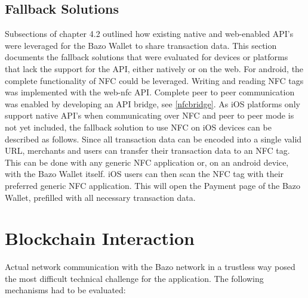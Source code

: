 \subsection{Fallback Solutions}
Subsections of chapter 4.2 outlined how existing native and web-enabled API's were leveraged for the Bazo Wallet to share transaction data. This section documents the fallback solutions that were evaluated for devices or platforms that lack the support for the API, either natively or on the web.
For android, the complete functionality of NFC could be leveraged. Writing and reading NFC tags was implemented with the web-nfc API. Complete peer to peer communication was enabled by developing an API bridge, see \ref{nfcbridge}.
As iOS platforms only support native API's when communicating over NFC and peer to peer mode is not yet included, the fallback solution to use NFC on iOS devices can be described as follows. Since all transaction data can be encoded into a single valid URL, merchants and users can transfer their transaction data to an NFC tag. This can be done with any generic NFC application or, on an android device, with the Bazo Wallet itself. iOS users can then scan the NFC tag with their preferred generic NFC application. This will open the Payment page of the Bazo Wallet, prefilled with all necessary transaction data.

\section{Blockchain Interaction}\label{blockchaininteraction}
Actual network communication with the Bazo network in a trustless way posed the most difficult technical challenge for the application. The following mechanisms had to be evaluated:

